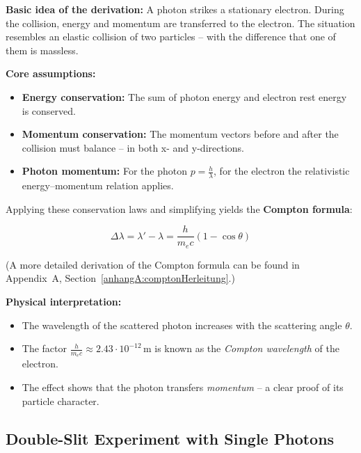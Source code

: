 \textbf{Basic idea of the derivation:}  
A photon strikes a stationary electron. During the collision, energy and momentum are transferred to the electron. The situation resembles an elastic collision of two particles – with the difference that one of them is massless.


\textbf{Core assumptions:}
\begin{itemize}
	\item \textbf{Energy conservation:} The sum of photon energy and electron rest energy is conserved.
	\item \textbf{Momentum conservation:} The momentum vectors before and after the collision must balance – in both x- and y-directions.
	\item \textbf{Photon momentum:} For the photon \( p = \frac{h}{\lambda} \), for the electron the relativistic energy–momentum relation applies.
\end{itemize}

Applying these conservation laws and simplifying yields the \textbf{Compton formula}:

\vspace{1em}
\begin{tcolorbox}[mathebox, title=Compton Formula]
	\label{box:comptonFormel}
	\small
	\[
	\Delta \lambda = \lambda' - \lambda = \frac{h}{m_e c}(1 - \cos \theta)
	\]
\end{tcolorbox}
\vspace{1em}
(A more detailed derivation of the Compton formula can be found in Appendix~A, Section~\ref{anhangA:comptonHerleitung}.) 

\vspace{1em}
\textbf{Physical interpretation:}
\begin{itemize}
	\item The wavelength of the scattered photon increases with the scattering angle \( \theta \).
	\item The factor \( \frac{h}{m_e c} \approx 2.43 \cdot 10^{-12}\,\mathrm{m} \) is known as the \emph{Compton wavelength} of the electron.
	\item The effect shows that the photon transfers \emph{momentum} – a clear proof of its particle character.
\end{itemize}
\subsection{Double-Slit Experiment with Single Photons}

